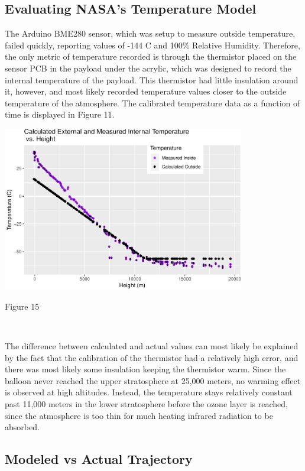 \documentclass[12pt,]{article}
\begin{document}
\subsection{Evaluating NASA's Temperature
Model}\label{evaluating-nasas-temperature-model}

The Arduino BME280 sensor, which was setup to measure outside
temperature, failed quickly, reporting values of -144 \degree C and
100\% Relative Humidity. Therefore, the only metric of temperature
recorded is through the thermistor placed on the sensor PCB in the
payload under the acrylic, which was designed to record the internal
temperature of the payload. This thermistor had little insulation around
it, however, and most likely recorded temperature values closer to the
outside temperature of the atmosphere. The calibrated temperature data
as a function of time is displayed in Figure 11.

\begin{center}\includegraphics[width=400px]{paper_files/figure-latex/temp_altitude-1} \end{center}

Figure 15

~

The difference between calculated and actual values can most likely be
explained by the fact that the calibration of the thermistor had a
relatively high error, and there was most likely some insulation keeping
the thermistor warm. Since the balloon never reached the upper
stratosphere at 25,000 meters, no warming effect is observed at high
altitudes. Instead, the temperature stays relatively constant past
11,000 meters in the lower stratosphere before the ozone layer is
reached, since the atmosphere is too thin for much heating infrared
radiation to be absorbed.

\subsection{Modeled vs Actual
Trajectory}\label{modeled-vs-actual-trajectory}
\end{document}
